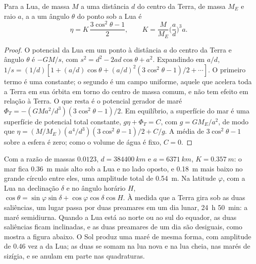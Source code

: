 \begin{theorem}\label{thm:b3:ocean-dynamics:equilibrium-tide}
Para a Lua, de massa $M$ a uma distância $d$ do centro da Terra, de
massa $M_E$ e raio $a$, a  a um ângulo $\theta$ do
ponto sob a Lua é
\[
\eta = K\,\frac{3\cos^2\theta - 1}{2},\qquad
K = \frac{M}{M_E}\Big(\frac{a}{d}\Big)^3 a .
\]
\end{theorem}

\begin{proof}
O potencial da Lua em um ponto à distância $a$ do
centro da Terra e ângulo $\theta$ é $-GM/s$, com $s^2 = d^2 - 2ad\cos\theta +
a^2$. Expandindo em $a/d$, $1/s = (1/d)[1 + (a/d)\cos\theta + (a/d)^2
(3\cos^2\theta - 1)/2 + \cdots]$. O primeiro termo é uma constante; o segundo
é um campo uniforme, aquele que acelera toda a Terra em sua órbita em torno do
centro de massa comum, e não tem efeito em relação à Terra.
O que resta é o potencial gerador de maré $\Phi_T = -(GMa^2/d^3)(3
\cos^2\theta - 1)/2$. Em equilíbrio, a superfície do mar é uma superfície de
potencial total constante, $g\eta + \Phi_T = C$, com $g = GM_E/a^2$, de modo que
$\eta = (M/M_E)(a^4/d^3)(3\cos^2\theta - 1)/2 + C/g$. A média de
$3\cos^2\theta - 1$ sobre a esfera é zero; como o volume de água é fixo,
$C = 0$.
\end{proof}

Com a razão de massas $0.0123$, $d = \qty{384400}{km}$ e $a =
\qty{6371}{km}$, $K = \qty{0.357}{m}$: o mar fica \qty{0.36}{m}
mais alto sob a Lua e no lado oposto, e \qty{0.18}{m} mais baixo no
grande círculo entre eles, uma amplitude total de \qty{0.54}{m}. Na latitude $\varphi$, com
a Lua na declinação $\delta$ e no ângulo horário $H$, $\cos\theta =
\sin\varphi\sin\delta + \cos\varphi\cos\delta\cos H$. À medida que a Terra gira
sob as duas saliências, um lugar passa por duas preamares em um dia lunar,
\qty{24}{h} \qty{50}{min}: a maré semidiurna. Quando a Lua está
ao norte ou ao sul do equador, as duas saliências ficam inclinadas, e as duas preamares
de um dia são desiguais, como mostra a figura abaixo. O Sol produz uma
maré de mesma forma, com amplitude de \num{0.46} vez a da Lua; as duas se somam na lua nova e
na lua cheia, nas marés de sizígia, e se anulam em parte nas quadraturas.

